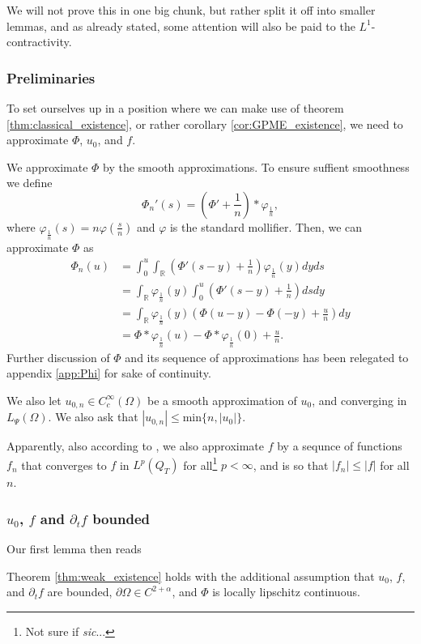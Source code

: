 \documentclass[11pt, a4paper]{article}
\begin{document}
We will not prove this in one big chunk, but rather split it off into smaller lemmas, and as already stated, some attention will also be paid to the $L^1$-contractivity.
\subsubsection{Preliminaries}
To set ourselves up in a position where we can make use of theorem \ref{thm:classical_existence}, or rather corollary \ref{cor:GPME_existence}, we need to approximate $\Phi$, $u_0$, and $f$.

We approximate $\Phi$ by the smooth approximations. To ensure suffient smoothness we define
\begin{equation*}
\Phi_n'(s) = \left( \Phi' + \frac{1}{n}\right)*\varphi_{\frac{1}{n}},
\end{equation*}
where $\varphi_{\frac{1}{n}}(s) = n\varphi\left( \frac{s}{n} \right)$ and $\varphi$ is the standard mollifier. Then, we can approximate $\Phi$ as
\begin{align*}
\Phi_n(u) &= \int_0^u \int_\mathbb{R}\left( \Phi'(s-y) + \frac{1}{n}\right)\varphi_{\frac{1}{n}}(y)dyds \\
&= \int_\mathbb{R}\varphi_{\frac{1}{n}}(y) \int_0^u \left( \Phi'(s-y) + \frac{1}{n}\right)dsdy \\
&= \int_\mathbb{R}\varphi_{\frac{1}{n}}(y) \left( \Phi(u-y) - \Phi(-y) + \frac{u}{n}\right)dy \\
&= \Phi * \varphi_{\frac{1}{n}}(u) - \Phi * \varphi_{\frac{1}{n}}(0) + \frac{u}{n}.
\end{align*}
Further discussion of $\Phi$ and its sequence of approximations has been relegated to appendix \ref{app:Phi} for sake of continuity.




We also let $u_{0,n}\in C^\infty_c(\Omega)$ be a smooth approximation of $u_0$, and converging in $L_\Psi(\Omega)$. We also ask that $|u_{0,n}| \leq $min$\{n,|u_0|\}$.

Apparently, also according to \citep{vazquez2007porous}, we also approximate $f$ by a sequnce of functions $f_n$ that converges to $f$ in $L^p(Q_T)$ for all\footnote{Not sure if \textit{sic}...} $p<\infty$, and is so that $|f_n| \leq |f|$ for all $n$.

\subsubsection{$u_0$, $f$ and $\partial_t f$ bounded}
Our first lemma then reads
\begin{lemma}
\label{lem:existence_part1}
Theorem \ref{thm:weak_existence} holds with the additional assumption that $u_0$, $f$, and $\partial_t f$ are bounded, $\partial \Omega \in C^{2+\alpha}$, and $\Phi$ is locally lipschitz continuous.
\end{lemma}
\end{document}
